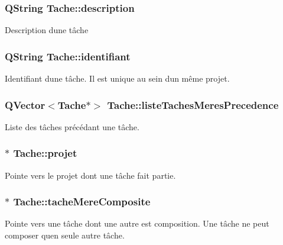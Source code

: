 \subsubsection[{description}]{\setlength{\rightskip}{0pt plus 5cm}Q\+String Tache\+::description\hspace{0.3cm}{\ttfamily [protected]}}\label{class_tache_ab3d06410b2c62ebfbe20f570c41dc4d4}
Description d\textquotesingle{}une tâche \hypertarget{class_tache_a9af1773c9b835900bba8814cccee450e}{}
\subsubsection[{identifiant}]{\setlength{\rightskip}{0pt plus 5cm}Q\+String Tache\+::identifiant\hspace{0.3cm}{\ttfamily [protected]}}\label{class_tache_a9af1773c9b835900bba8814cccee450e}
Identifiant d\textquotesingle{}une tâche. Il est unique au sein d\textquotesingle{}un même projet. \hypertarget{class_tache_a0f73920789e27b7c2aeb47d171d5e543}{}
\subsubsection[{liste\+Taches\+Meres\+Precedence}]{\setlength{\rightskip}{0pt plus 5cm}Q\+Vector$<${\bf Tache}$\ast$$>$ Tache\+::liste\+Taches\+Meres\+Precedence\hspace{0.3cm}{\ttfamily [protected]}}\label{class_tache_a0f73920789e27b7c2aeb47d171d5e543}
Liste des tâches précédant une tâche. \hypertarget{class_tache_a0c6d513a2a376b18cb73ab726fe4dec1}{}
\subsubsection[{projet}]{$\ast$ Tache\+::projet\hspace{0.3cm}{\ttfamily [protected]}}\label{class_tache_a0c6d513a2a376b18cb73ab726fe4dec1}
Pointe vers le projet dont une tâche fait partie. \hypertarget{class_tache_a62e6fe2722630c7bdf9a4a6a42364a19}{}
\subsubsection[{tache\+Mere\+Composite}]{$\ast$ Tache\+::tache\+Mere\+Composite\hspace{0.3cm}{\ttfamily [protected]}}\label{class_tache_a62e6fe2722630c7bdf9a4a6a42364a19}
Pointe vers une tâche dont une autre est composition. Une tâche ne peut composer qu\textquotesingle{}en seule autre tâche. \hypertarget{class_tache_a1d3d20046c0c4cc8482f71bb555b79cf}{}
